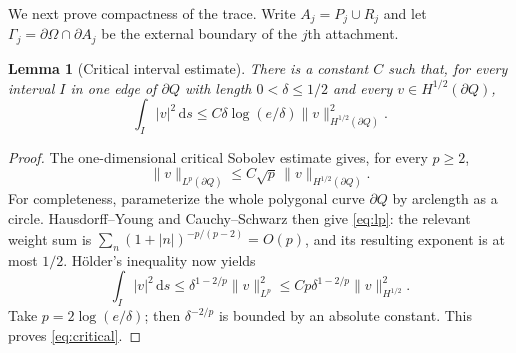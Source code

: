 \documentclass[11pt]{article}
\newtheorem{lemma}{Lemma}
\newcommand{\Om}{\Omega}
\newcommand{\dd}{\,\mathrm d}
\begin{document}
\begin{center}
\end{center}

We next prove compactness of the trace.  Write $A_j=P_j\cup R_j$ and let
$\Gamma_j=\partial\Om\cap\partial A_j$ be the external boundary of the
$j$th attachment.

\begin{lemma}[Critical interval estimate]\label{lem:critical}
There is a constant $C$ such that, for every interval $I$ in one edge of
$\partial Q$ with length $0<\delta\le1/2$ and every
$v\in H^{1/2}(\partial Q)$,
\begin{equation}\label{eq:critical}
 \int_I|v|^2\dd s\le C\delta\log(e/\delta)
 \|v\|_{H^{1/2}(\partial Q)}^2.
\end{equation}
\end{lemma}

\begin{proof}
The one-dimensional critical Sobolev estimate gives, for every $p\ge2$,
\begin{equation}\label{eq:lp}
 \|v\|_{L^p(\partial Q)}\le C\sqrt p\,
 \|v\|_{H^{1/2}(\partial Q)}.
\end{equation}
For completeness, parameterize the whole polygonal curve $\partial Q$ by
arclength as a circle.  Hausdorff--Young and Cauchy--Schwarz then give
\eqref{eq:lp}: the relevant weight
sum is
$\sum_n(1+|n|)^{-p/(p-2)}=O(p)$, and its resulting exponent is at most
$1/2$.  H\"older's inequality now yields
\[
 \int_I|v|^2\dd s
 \le \delta^{1-2/p}\|v\|_{L^p}^2
 \le Cp\delta^{1-2/p}\|v\|_{H^{1/2}}^2.
\]
Take $p=2\log(e/\delta)$; then $\delta^{-2/p}$ is bounded by an absolute
constant.  This proves \eqref{eq:critical}.
\end{proof}
\end{document}
